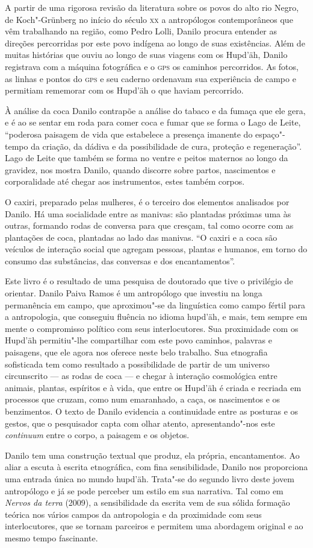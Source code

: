 A partir de uma rigorosa revisão da literatura sobre os povos do alto
rio Negro, de Koch"-Grünberg no início do século \textsc{xx} a antropólogos
contemporâneos que vêm trabalhando na região, como Pedro Lolli, Danilo
procura entender as direções percorridas por este povo indígena ao longo
de suas existências. Além de muitas histórias que ouviu ao longo de suas
viagens com os Hupd'äh, Danilo registrava com a máquina fotográfica e o
\textsc{gps} os caminhos percorridos. As fotos, as linhas e pontos do \textsc{gps} e seu
caderno ordenavam sua experiência de campo e permitiam rememorar com os
Hupd'äh o que haviam percorrido.

À análise da coca Danilo contrapõe a análise do tabaco e da fumaça que
ele gera, e é ao se sentar em roda para comer coca e fumar que se forma
o Lago de Leite, ``poderosa paisagem de vida que estabelece a presença
imanente do espaço"-tempo da criação, da dádiva e da possibilidade de
cura, proteção e regeneração''. Lago de Leite que também se forma no
ventre e peitos maternos ao longo da gravidez, nos mostra Danilo, quando
discorre sobre partos, nascimentos e corporalidade até chegar aos
instrumentos, estes também corpos.

O caxiri, preparado pelas mulheres, é o terceiro dos elementos
analisados por Danilo. Há uma socialidade entre as manivas: são
plantadas próximas uma às outras, formando rodas de conversa para que
cresçam, tal como ocorre com as plantações de coca, plantadas ao lado
das manivas. ``O caxiri e a coca são veículos de interação social que
agregam pessoas, plantas e humanos, em torno do consumo das substâncias,
das conversas e dos encantamentos''.

Este livro é o resultado de uma pesquisa de doutorado que tive o
privilégio de orientar. Danilo Paiva Ramos é um antropólogo que investiu
na longa permanência em campo, que aproximou"-se da linguística como
campo fértil para a antropologia, que conseguiu fluência no idioma
hupd'äh, e mais, tem sempre em mente o compromisso político com seus
interlocutores. Sua proximidade com os Hupd'äh permitiu"-lhe compartilhar
com este povo caminhos, palavras e paisagens, que ele agora nos oferece
neste belo trabalho. Sua etnografia sofisticada tem como resultado a
possibilidade de partir de um universo circunscrito --- as rodas de coca
--- e chegar à interação cosmológica entre animais, plantas, espíritos e
à vida, que entre os Hupd'äh é criada e recriada em processos que
cruzam, como num emaranhado, a caça, os nascimentos e os benzimentos. O
texto de Danilo evidencia a continuidade entre as posturas e os gestos,
que o pesquisador capta com olhar atento, apresentando"-nos este
\textit{continuum} entre o corpo, a paisagem e os objetos.

Danilo tem uma construção textual que produz, ela própria,
encantamentos. Ao aliar a escuta à escrita etnográfica, com fina
sensibilidade, Danilo nos proporciona uma entrada única no mundo
hupd'äh. Trata"-se do segundo livro deste jovem antropólogo e já se pode
perceber um estilo em sua narrativa. Tal como em \textit{Nervos da terra}
(2009), a sensibilidade da escrita vem de sua sólida formação
teórica nos vários campos da antropologia e da proximidade com seus
interlocutores, que se tornam parceiros e permitem uma abordagem
original e ao mesmo tempo fascinante.